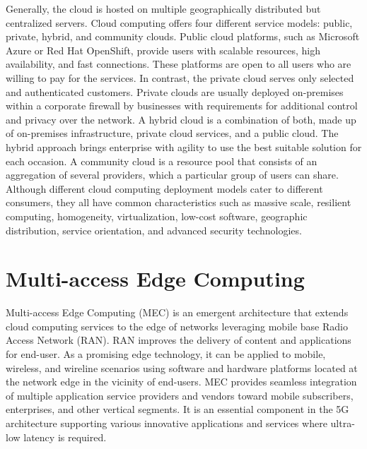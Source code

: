 Generally, the cloud is hosted on multiple geographically distributed but centralized servers. Cloud computing offers four different service models: public, private, hybrid, and community clouds. Public cloud platforms, such as Microsoft Azure or Red Hat OpenShift, provide users with scalable resources, high availability, and fast connections. These platforms are open to all users who are willing to pay for the services. In contrast, the private cloud serves only selected and authenticated customers. Private clouds are usually deployed on-premises within a corporate firewall by businesses with requirements for additional control and privacy over the network. A hybrid cloud is a combination of both, made up of on-premises infrastructure, private cloud services, and a public cloud. The hybrid approach brings enterprise with agility to use the best suitable solution for each occasion\cite{NetApp}. A community cloud is a resource pool that consists of an aggregation of several providers, which a particular group of users can share. Although different cloud computing deployment models cater to different consumers, they all have common characteristics such as massive scale, resilient computing, homogeneity, virtualization, low-cost software, geographic distribution, service orientation, and advanced security technologies. \cite{MicrosoftAzure}\cite{Taleb2017}\cite{Xing2012}









\section{Multi-access Edge Computing}

Multi-access Edge Computing (MEC) is an emergent architecture that extends cloud computing services to the edge of networks leveraging mobile base Radio Access Network (RAN). RAN improves the delivery of content and applications for end-user. As a promising edge technology, it can be applied to mobile, wireless, and wireline scenarios using software and hardware platforms located at the network edge in the vicinity of end-users. MEC provides seamless integration of multiple application service providers and vendors toward mobile subscribers, enterprises, and other vertical segments. It is an essential component in the 5G architecture supporting various innovative applications and services where ultra-low latency is required. \cite{Abbas2018}

